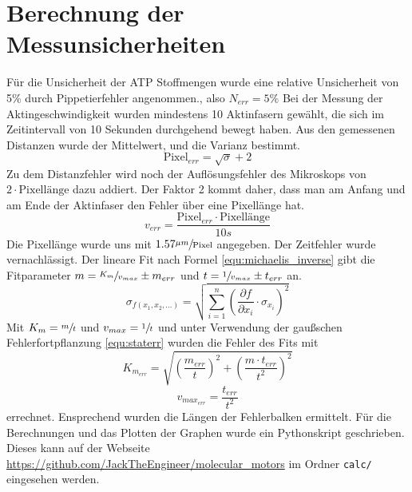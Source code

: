 \section{Berechnung der Messunsicherheiten}
Für die Unsicherheit der ATP Stoffmengen wurde eine relative Unsicherheit
von 5\% durch Pippetierfehler angenommen., also $N_{err} = 5 \%$
Bei der Messung der Aktingeschwindigkeit wurden mindestens 10 Aktinfasern gewählt,
die sich im Zeitintervall von 10 Sekunden durchgehend bewegt haben.
Aus den gemessenen Distanzen wurde der Mittelwert, und die Varianz bestimmt.
\[
  \text{Pixel}_{err} = \sqrt{\sigma} + 2
\]
Zu dem Distanzfehler wird noch der Auflösungsfehler des Mikroskops
von $2 \cdot \text{Pixellänge}$ dazu addiert. Der Faktor 2 kommt daher,
dass man am Anfang und am Ende der Aktinfaser den Fehler über eine Pixellänge hat.
\[
  v_{err} = \frac{\text{Pixel}_{err} \cdot \text{Pixellänge}}{10s}
\]
Die Pixellänge wurde uns mit $1.57\sfrac{\mu m}{\text{Pixel}}$ angegeben.
Der Zeitfehler wurde vernachlässigt.
Der lineare Fit nach Formel \ref{equ:michaelis_inverse} gibt die Fitparameter
$m = \sfrac{K_m}{v_{max}} \pm m_{err}$ und $t = \sfrac{1}{v_{max}} \pm t_{err}$ an.
\begin{equation}
	\sigma_{f(x_1,x_2,...)} = \sqrt{\sum\limits_{i=1}^n (\frac{\partial f}{\partial x_i} \cdot \sigma_{x_i})^2}
	\label{equ:staterr}
\end{equation}
Mit $K_m = \sfrac{m}{t}$ und $v_{max} = \sfrac{1}{t}$ und unter Verwendung der
gaußschen Fehlerfortpflanzung \ref{equ:staterr} wurden die
Fehler des Fits mit
\[
  K_{m_{err}} = \sqrt{(\frac{m_{err}}{t})^2 + (\frac{m \cdot t_{err}}{t^2})^2}
\] 
\[
  v_{max_{err}} = \frac{t_{err}}{t^2}
\]
errechnet.
Ensprechend wurden die Längen der Fehlerbalken ermittelt.
Für die Berechnungen und das Plotten der Graphen wurde ein Pythonskript geschrieben.
Dieses kann auf der Webseite \url{https://github.com/JackTheEngineer/molecular_motors}
im Ordner \texttt{calc/} eingesehen werden.

